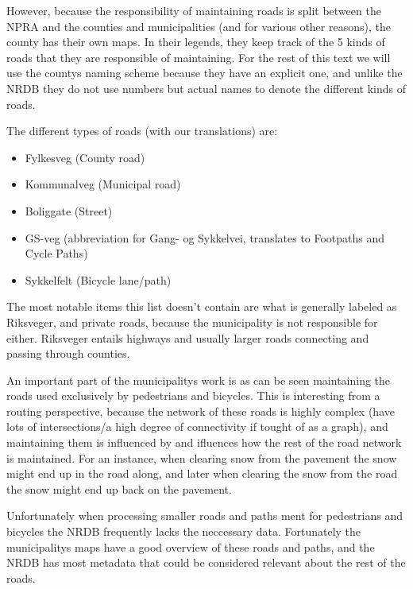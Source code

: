 However, because the responsibility of maintaining roads is split between the NPRA and the counties and municipalities (and for various other reasons), the county has their own maps. In their legends, they keep track of the 5 kinds of roads that they are responsible of maintaining. For the rest of this text we will use the countys naming scheme because they have an explicit one, and unlike the NRDB they do not use numbers but actual names to denote the different kinds of roads.

The different types of roads (with our translations) are:
\begin{itemize}
	\item Fylkesveg (County road)
	\item Kommunalveg (Municipal road)
	\item Boliggate (Street)
	\item GS-veg (abbreviation for Gang- og Sykkelvei, translates to Footpaths and Cycle Paths) %
	\item Sykkelfelt (Bicycle lane/path)
\end{itemize}

The most notable items this list doesn't contain are what is generally labeled as Riks\-veger, and private roads, because the municipality is not responsible for either. Riks\-veger entails highways and usually larger roads connecting and passing through counties.

An important part of the municipalitys work is as can be seen maintaining the roads used exclusively by pedestrians and bicycles. This is interesting from a routing perspective, because the network of these roads is highly complex (have lots of intersections/a high degree of connectivity if tought of as a graph), and maintaining them is influenced by and ifluences how the rest of the road network is maintained. For an instance, when clearing snow from the pavement the snow might end up in the road along, and later when clearing the snow from the road the snow might end up back on the pavement.

Unfortunately when processing smaller roads and paths ment for pedestrians and bicycles the NRDB frequently lacks the neccessary data. Fortunately the municipalitys maps have a good overview of these roads and paths, and the NRDB has most metadata that could be considered relevant about the rest of the roads.

